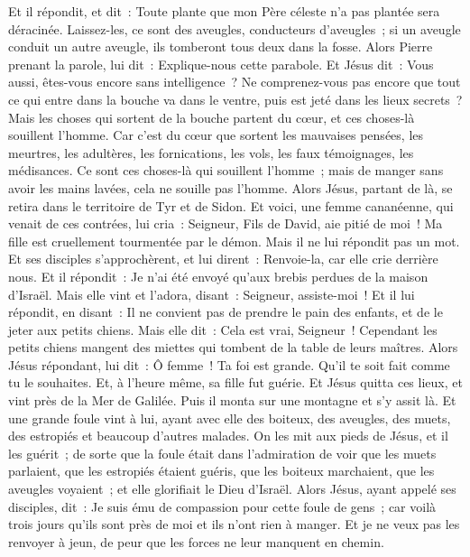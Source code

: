\begin{multicols}{2}
Et il répondit, et dit~: Toute plante que mon Père céleste n'a pas plantée sera déracinée.
Laissez-les, ce sont des aveugles, conducteurs d'aveugles~; si un aveugle conduit un autre aveugle, ils tomberont tous deux dans la fosse.
Alors Pierre prenant la parole, lui dit~: Explique-nous cette parabole.
Et Jésus dit~: Vous aussi, êtes-vous encore sans intelligence~?
Ne comprenez-vous pas encore que tout ce qui entre dans la bouche va dans le ventre, puis est jeté dans les lieux secrets~?
Mais les choses qui sortent de la bouche partent du cœur, et ces choses-là souillent l'homme.
Car c'est du cœur que sortent les mauvaises pensées, les meurtres, les adultères, les fornications, les vols, les faux témoignages, les médisances.
Ce sont ces choses-là qui souillent l'homme~; mais de manger sans avoir les mains lavées, cela ne souille pas l'homme.
Alors Jésus, partant de là, se retira dans le territoire de Tyr et de Sidon.
Et voici, une femme cananéenne, qui venait de ces contrées, lui cria~: Seigneur, Fils de David, aie pitié de moi~! Ma fille est cruellement tourmentée par le démon.
Mais il ne lui répondit pas un mot. Et ses disciples s'approchèrent, et lui dirent~: Renvoie-la, car elle crie derrière nous.
Et il répondit~: Je n'ai été envoyé qu'aux brebis perdues de la maison d'Israël.
Mais elle vint et l'adora, disant~: Seigneur, assiste-moi~!
Et il lui répondit, en disant~: Il ne convient pas de prendre le pain des enfants, et de le jeter aux petits chiens.
Mais elle dit~: Cela est vrai, Seigneur~! Cependant les petits chiens mangent des miettes qui tombent de la table de leurs maîtres.
Alors Jésus répondant, lui dit~: Ô femme~! Ta foi est grande. Qu'il te soit fait comme tu le souhaites. Et, à l'heure même, sa fille fut guérie.
Et Jésus quitta ces lieux, et vint près de la Mer de Galilée. Puis il monta sur une montagne et s'y assit là.
Et une grande foule vint à lui, ayant avec elle des boiteux, des aveugles, des muets, des estropiés et beaucoup d'autres malades. On les mit aux pieds de Jésus, et il les guérit~;
de sorte que la foule était dans l'admiration de voir que les muets parlaient, que les estropiés étaient guéris, que les boiteux marchaient, que les aveugles voyaient~; et elle glorifiait le Dieu d'Israël.
Alors Jésus, ayant appelé ses disciples, dit~: Je suis ému de compassion pour cette foule de gens~; car voilà trois jours qu'ils sont près de moi et ils n'ont rien à manger. Et je ne veux pas les renvoyer à jeun, de peur que les forces ne leur manquent en chemin.

\end{multicols}
